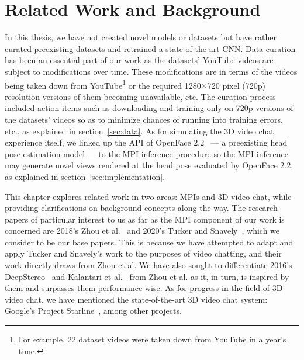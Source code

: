 \chapter{Related Work and Background}\label{ch2:related-work-background}

In this thesis, we have not created novel models or datasets but have rather curated preexisting datasets and retrained a state-of-the-art CNN. Data curation has been an essential part of our work as the datasets' YouTube videos are subject to modifications over time. These modifications are in terms of the videos being taken down from YouTube\footnote{For example, 22 dataset videos were taken down from YouTube in a year's time.} or the required 1280$\times$720 pixel (720p) resolution versions of them becoming unavailable, etc. The curation process included action items such as downloading and training only on 720p versions of the datasets' videos so as to minimize chances of running into training errors, etc., as explained in section~\ref{sec:data}. As for simulating the 3D video chat experience itself, we linked up the API of OpenFace 2.2~\cite{baltrusaitis_openface_2018} --- a preexisting head pose estimation model --- to the MPI inference procedure so the MPI inference may generate novel views rendered at the head pose evaluated by OpenFace 2.2, as explained in section~\ref{sec:implementation}.

This chapter explores related work in two areas: MPIs and 3D video chat, while providing clarifications on background concepts along the way. The research papers of particular interest to us as far as the MPI component of our work is concerned are 2018's Zhou et al.~\cite{zhou2018stereo} and 2020's Tucker and Snavely~\cite{single_view_mpi}, which we consider to be our base papers. This is because we have attempted to adapt and apply Tucker and Snavely's work to the purposes of video chatting, and their work directly draws from Zhou et al. We have also sought to differentiate 2016's DeepStereo~\cite{deep_stereo_2016} and Kalantari et al.~\cite{kalantari_2016} from Zhou et al. as it, in turn, is inspired by them and surpasses them performance-wise. As for progress in the field of 3D video chat, we have mentioned the state-of-the-art 3D video chat system: Google's Project Starline~\cite{lawrence_project_2021}, among other projects.


